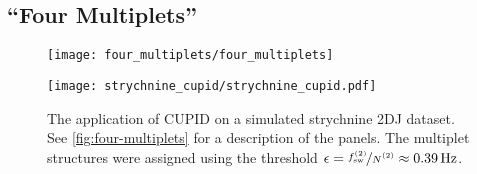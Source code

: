 \subsection{``Four Multiplets''}
\label{subsec:four-mp}
\begin{figure}
    \centering
    \texttt{[image: four\_multiplets/four\_multiplets]}
    \caption[
        The result of applying \acs{CUPID} on 5 instances of simulated
        \acs{2DJ} datasets with 4 heavily overlapping multiplet structures.
    ]{
        The result of applying \ac{CUPID} on 5 instances of simulated \ac{2DJ}
        datasets with 4 heavily overlapping multiplet structures.
        \textbf{a.} Black: pure shift spectrum generated by \ac{CUPID} (via the
        \ang{-45} signal).
        Grey: \ac{1D} spectrum simulated with \textsc{Spinach}, using the same spin
        system as was used to produce the \ac{2DJ} dataset, but with all scalar
        couplings set to \qty{0}{\hertz}. This has been offset slightly for
        clarity.
        \textbf{b.} \ac{1D} spectrum of the dataset, produced using the first
        direct-dimension \ac{FID} in the \ac{2DJ} dataset.
        \textbf{c.} Multiplet structures predicted, using the threshold $\epsilon
        = \nicefrac{\fswtwo}{\Ntwo} \approx \qty{0.98}{\hertz}$.
        \textbf{d.} Contour plot of the \ac{2DJ} spectrum in magnitude-mode,
        with coloured points denoting the frequencies of oscillators in the
        estimation result. The coloured vertical lines denote the predicted
        central frequencies of each multiplet structure.
    }
    \label{fig:four-multiplets}
    \vspace{20pt}
    \texttt{[image: strychnine\_cupid/strychnine\_cupid.pdf]}
    \caption[
        The application of \acs{CUPID} on a simulated strychnine \acs{2DJ}
        dataset.
    ]
    {
        The application of \ac{CUPID} on a simulated strychnine \ac{2DJ} dataset.
        See \cref{fig:four-multiplets} for a description of the panels.
        The multiplet structures were assigned using the threshold
        $\epsilon = \nicefrac{\fswtwo}{\Ntwo} \approx \qty{0.39}{\hertz}$.
    }
    \label{fig:strychnine-cupid}
\end{figure}

